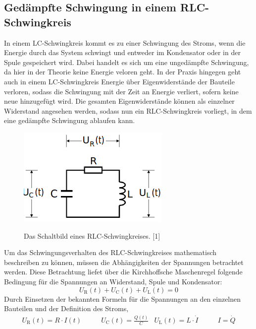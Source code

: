 \documentclass[titlepage = firstcover]{scrartcl}
\begin{document}
        \subsection{Gedämpfte Schwingung in einem RLC-Schwingkreis}
            In einem LC-Schwingkreis kommt es zu einer Schwingung des Stroms, wenn die Energie durch das System schwingt und entweder im Kondensator oder in
            der Spule gespeichert wird. Dabei handelt es sich um eine ungedämpfte Schwingung, da hier in der Theorie keine Energie veloren geht. In der Praxis
            hingegen geht auch in einem LC-Schwingkreis Energie über Eigenwiderstände der Bauteile verloren, sodass die Schwingung mit der Zeit an Energie 
            verliert, sofern keine neue hinzugefügt wird. Die gesamten Eigenwiderstände können als einzelner Widerstand angesehen werden, sodass nun ein 
            RLC-Schwingkreis vorliegt, in dem eine gedämpfte Schwingung ablaufen kann.
            \begin{figure}[h]
                \centering
                \caption{Das Schaltbild eines RLC-Schwingkreises. [1]}
                \includegraphics[width = 0.4\linewidth]{RLC.png}
                \label{fig:RLC}
            \end{figure}
            \FloatBarrier
            Um das Schwingungsverhalten des RLC-Schwingkreises mathematisch beschreiben zu können, müssen die Abhängigkeiten der Spannungen betrachtet werden.
            Diese Betrachtung liefet über die Kirchhoffsche Maschenregel folgende Bedingung für die Spannungen an Widerstand, Spule und Kondensator:
            \begin{equation}
                U_{\text{R}}(t) + U_{\text{C}}(t) + U_{\text{L}}(t) = 0
                \label{eqn:Masche}
            \end{equation}  
            Durch Einsetzen der bekannten Formeln für die Spannungen an den einzelnen Bauteilen und der Definition des Stroms,
            \begin{align}
                U_{\text{R}}(t) = R \cdot I(t) &\qquad U_{\text{C}}(t) = \frac{Q(t)}{C} & U_{\text{L}}(t) = L \cdot \dot{I} &\qquad I = \dot{Q} 
                \label{eqn:Spannungen}
            \end{align}
\end{document}
